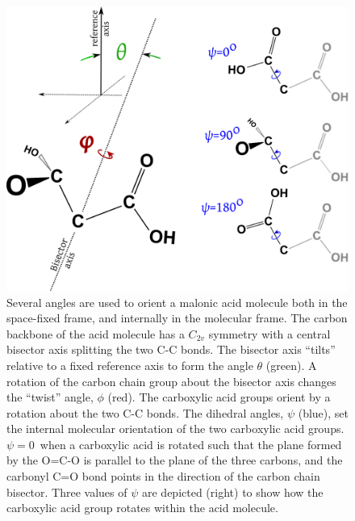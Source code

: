 \begin{figure}[h!]
	\begin{center}
		\includegraphics[scale=1.0]{images/malonic-angles/malonic-angles.png}
		\caption{Several angles are used to orient a malonic acid molecule both in the space-fixed frame, and internally in the molecular frame. The carbon backbone of the acid molecule has a $C_{2v}$ symmetry with a central bisector axis splitting the two C-C bonds. The bisector axis ``tilts'' relative to a fixed reference axis to form the angle $\theta$ (green). A rotation of the carbon chain group about the bisector axis changes the ``twist'' angle, $\phi$ (red). The carboxylic acid groups orient by a rotation about the two C-C bonds. The dihedral angles, $\psi$ (blue), set the internal molecular orientation of the two carboxylic acid groups. $\psi=0$\textdegree~when a carboxylic acid is rotated such that the plane formed by the O=C-O is parallel to the plane of the three carbons, and the carbonyl C=O bond points in the direction of the carbon chain bisector. Three values of $\psi$ are depicted (right) to show how the carboxylic acid group rotates within the acid molecule.}
		\label{fig:angle-definitions}
	\end{center}
\end{figure}

